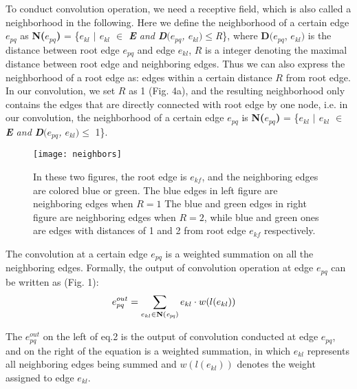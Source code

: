 \documentclass[a4paper,11pt]{article}
\begin{document}
To conduct convolution operation, we need a receptive field, which is also called a neighborhood in the following. Here we define the neighborhood of a certain edge $e_{pq}$ as 
{\bf  N({\it $e_{pq}$})} = \{{\it $e_{kl}$ $|$ $e_{kl}$ $\in$ {\bf E} and {\bf D}$(e_{pq}$, $e_{kl})$$\leqslant$R}\}, where {\bf D}$(e_{pq}$, $e_{kl})$ is the distance between root edge $e_{pq}$ and edge $e_{kl}$, $R$ is a integer denoting the maximal distance between root edge and neighboring edges.   Thus we can also express the neighborhood of a root edge as: edges within a certain distance $R$ from root edge. In our convolution, we set $R$ as 1 (Fig. 4a), and the resulting neighborhood only contains the edges that are directly connected with root edge by one node, i.e. in our convolution, the neighborhood of a certain edge $e_{pq}$ is {\bf  N({\it $e_{pq}$})} = \{{{\it $e_{kl}$ $|$ $e_{kl}$ $\in$ {\bf E} and {\bf D}$(e_{pq}$, $e_{kl})$$\leqslant$} 1}\}.



\begin{figure}
\centering
\texttt{[image: neighbors]}
\caption{In these two figures, the root edge is $e_{kf}$, and the neighboring edges are colored blue or green. The blue edges in left figure are neighboring edges when $R=1$ The blue and green edges in right figure are neighboring edges when $R=2$, while blue and green ones are edges with distances of 1 and 2 from root edge $e_{kf}$ respectively.}
\label{fig:example}
\end{figure}


The convolution at a certain edge $e_{pq}$ is a weighted summation on all the neighboring edges. Formally, the output of convolution operation at edge $e_{pq}$ can be written as (Fig. 1):
\begin{align} 
&e_{pq}^{out} = \sum_{e_{kl} \in {\bf N({\it e_{pq}})}} e_{kl} \cdot w(l(e_{kl}))&
\end{align}

The  $e_{pq}^{out}$ on the left of eq.2 is the output of convolution conducted at edge $e_{pq}$, and on the right of the equation is a weighted summation, in which $e_{kl}$ represents all neighboring edges being summed and $w(l(e_{kl}))$ denotes the weight assigned to edge $e_{kl}$. 
\end{document}
